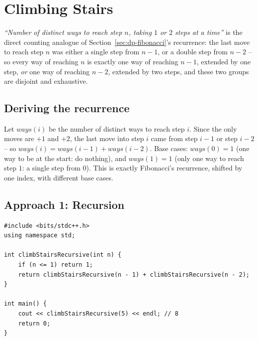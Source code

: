 \section{Climbing Stairs}
\label{sec:dp-climbing-stairs}


\begin{patternbox}
\emph{``Number of distinct ways to reach step $n$, taking $1$ or $2$
steps at a time''} is the direct counting analogue of
Section~\ref{sec:dp-fibonacci}'s recurrence: the last move to reach step
$n$ was either a single step from $n-1$, or a double step from $n-2$ --
so every way of reaching $n$ is exactly one way of reaching $n-1$,
extended by one step, \emph{or} one way of reaching $n-2$, extended by
two steps, and these two groups are disjoint and exhaustive.
\end{patternbox}

\subsection*{Deriving the recurrence}

Let $\textit{ways}(i)$ be the number of distinct ways to reach step $i$.
Since the only moves are $+1$ and $+2$, the last move into step $i$ came
from step $i-1$ or step $i-2$ -- so $\textit{ways}(i) =
\textit{ways}(i-1) + \textit{ways}(i-2)$. Base cases:
$\textit{ways}(0)=1$ (one way to be at the start: do nothing), and
$\textit{ways}(1)=1$ (only one way to reach step $1$: a single step from
$0$). This is exactly Fibonacci's recurrence, shifted by one index, with
different base cases.

\subsection*{Approach 1: Recursion}

\begin{lstlisting}
#include <bits/stdc++.h>
using namespace std;

int climbStairsRecursive(int n) {
    if (n <= 1) return 1;
    return climbStairsRecursive(n - 1) + climbStairsRecursive(n - 2);
}

int main() {
    cout << climbStairsRecursive(5) << endl; // 8
    return 0;
}
\end{lstlisting}

